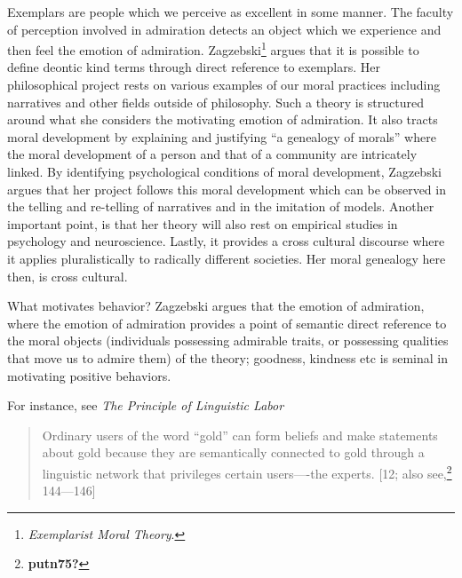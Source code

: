 \documentclass[
  12pt,
]{book}
\theoremstyle{definition}
\theoremstyle{definition}
\theoremstyle{definition}
\theoremstyle{definition}
\theoremstyle{remark}
\begin{document}
Exemplars are people which we perceive as excellent in some manner. The faculty of perception involved in admiration detects an object which we experience and then feel the emotion of admiration. Zagzebski\footnote{\emph{Exemplarist {Moral Theory}}.} argues that it is possible to define deontic kind terms through direct reference to exemplars. Her philosophical project rests on various examples of our moral practices including narratives and other fields outside of philosophy. Such a theory is structured around what she considers the motivating emotion of admiration. It also tracts moral development by explaining and justifying ``a genealogy of morals'' where the moral development of a person and that of a community are intricately linked. By identifying psychological conditions of moral development, Zagzebski argues that her project follows this moral development which can be observed in the telling and re-telling of narratives and in the imitation of models. Another important point, is that her theory will also rest on empirical studies in psychology and neuroscience. Lastly, it provides a cross cultural discourse where it applies pluralistically to radically different societies. Her moral genealogy here then, is cross cultural.

What motivates behavior? Zagzebski argues that the emotion of admiration, where the emotion of admiration provides a point of semantic direct reference to the moral objects (individuals possessing admirable traits, or possessing qualities that move us to admire them) of the theory; goodness, kindness etc is seminal in motivating positive behaviors.

For instance, see \emph{The Principle of Linguistic Labor}

\begin{quote}
Ordinary users of the word ``gold'' can form beliefs and make statements about gold because they are semantically connected to gold through a linguistic network that privileges certain users----the experts. {[}12; also see,\footnote{\textbf{putn75?}} 144---146{]}
\end{quote}
\end{document}
